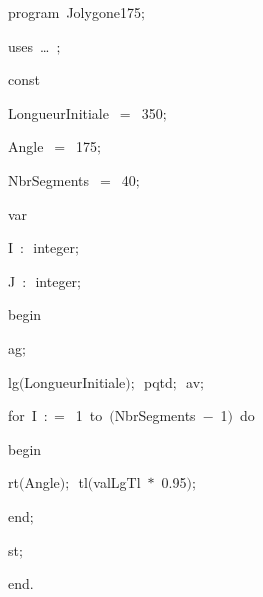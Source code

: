 
{
\parindent {}
\medskip

\carrenoir
\vspace{\neglskip}\mbox{\blc  \idt  \mcl program\idt \ Jolygone175$;$
}\par 
\vspace{\neglskip}\mbox{\blc \blk\idt \mcl uses\idt \ \ldots\ $;$
}\par 
\pagebreak[3] 
\vspace{\neglskip}\mbox{\blc  \blk\idt  \mcl const\idt }\par 
\vspace{\neglskip}\mbox{\blc  \blk\blk\idt  LongueurInitiale\ $=$\ 350$;$}\par 
\vspace{\neglskip}\mbox{\blc  \blk\blk\idt  Angle\ $=$\ 175$;$}\par 
\vspace{\neglskip}\mbox{\blc  \blk\blk\idt  NbrSegments\ $=$\ 40$;$}\par 
\pagebreak[3] 
\vspace{\neglskip}\mbox{\blc  \blk\idt  \mcl var\idt }\par 
\vspace{\neglskip}\mbox{\blc  \blk\blk\idt  I\ $:$\ integer$;$}\par 
\vspace{\neglskip}\mbox{\blc  \blk\blk\idt  J\ $:$\ integer$;$}\par 
\vspace{\neglskip}\mbox{\blc  \idt  \mcl begin\idt }\par 
\vspace{\neglskip}\mbox{\blc  \blk\idt  ag$;$\ }\par 
\vspace{\neglskip}\mbox{\blc  \blk\idt  lg$($LongueurInitiale$)$$;$\ pqtd$;$\ av$;$\ }\par 
\pagebreak[3] 
\vspace{\neglskip}\mbox{\blc  \blk\idt  \mcl for\idt \ I\ $:$$=$\ 1\ \mcl to\idt \ $($NbrSegments\ $-$\ 1$)$\ \mcl do\idt }\par 
\vspace{\neglskip}\mbox{\blc  \blk\blk\idt  \mcl begin\idt }\par 
\vspace{\neglskip}\mbox{\blc  \blk\blk\blk\idt  rt$($Angle$)$$;$\ tl$($valLgTl\ $\ast$\ 0$.$95$)$$;$}\par 
\vspace{\neglskip}\mbox{\blc  \blk\blk\idt  \mcl end\idt $;$}\par 
\vspace{\neglskip}\mbox{\blc  \blk\idt  st$;$}\par 
\vspace{\neglskip}\mbox{\blc  \idt  \mcl end\idt $.$}\par 

\medskip }


